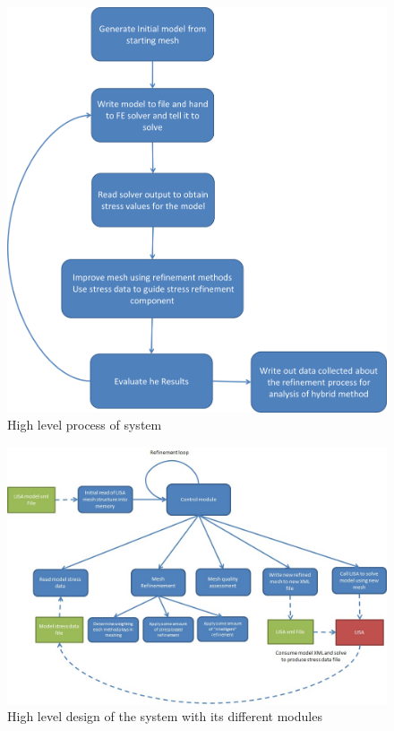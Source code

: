 \begin{figure}[H]
  \centerline{\includegraphics[width=150mm, scale=1]{../Graphics/OverallProcess.png}}
  \caption{High level process of system}
  \label{fig:h-refinementImp}
\end{figure}



\begin{figure}[H]
  \centerline{\includegraphics[width=150mm, scale=1]{../Graphics/SystemDesignDiagram.jpeg}}
  \caption{High level design of the system with its different modules}
  \label{fig:h-refinementImp}
\end{figure}




